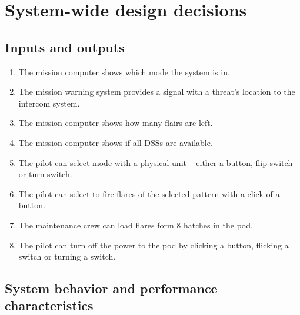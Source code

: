\documentclass[Main]{subfiles}
\begin{document}
\chapter{System-wide design decisions}


\section{Inputs and outputs}

\begin{enumerate}[label= DDD-1.\arabic*:]

\item The mission computer shows which mode the system is in. \label{DDD-11}

\item The mission warning system provides a signal with a threat's location to the intercom system.\label{DDD-12}

\item The mission computer shows how many flairs are left.\label{DDD-13}

\item The mission computer shows if all DSSs are available.\label{DDD-14}

\item The pilot can select mode with a physical unit -- either a button, flip switch or turn switch.\label{DDD-15}

\item The pilot can select to fire flares of the selected pattern with a click of a button.\label{DDD-16}

\item The maintenance crew can load flares form 8 hatches in the pod.\label{DDD-17}

\item The pilot can turn off the power to the pod by clicking a button, flicking a switch or turning a switch.\label{DDD-18}

\end{enumerate}




\section{System behavior and performance characteristics}
\end{document}
